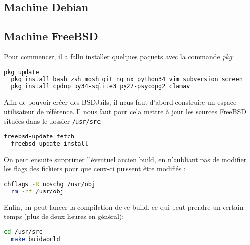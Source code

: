 \documentclass[10pt,a4paper]{article}
\begin{document}
\subsection{Machine Debian}
\label{sub:Machine Debian}

\subsection{Machine FreeBSD}
\label{sub:Machine FreeBSD}

Pour commencer, il a fallu installer quelques paquets avec la commande \emph{pkg}:
\begin{lstlisting}[language=bash]
  pkg update
  pkg install bash zsh mosh git nginx python34 vim subversion screen
  pkg install cpdup py34-sqlite3 py27-psycopg2 clamav
\end{lstlisting}

Afin de pouvoir créer des BSDJails, il nous faut d'abord construire un espace utilisateur de référence. Il nous faut pour cela mettre à jour les sources FreeBSD situées dans le dossier \texttt{/usr/src}:
\begin{lstlisting}[language=bash]
  freebsd-update fetch
  freebsd-update install
\end{lstlisting}
On peut ensuite supprimer l'éventuel ancien build, en n'oubliant pas de modifier les flags des fichiers pour que ceux-ci puissent être modifiés :
\begin{lstlisting}[language=bash]
  chflags -R noschg /usr/obj
  rm -rf /usr/obj
\end{lstlisting}
Enfin, on peut lancer la compilation de ce build, ce qui peut prendre un certain temps (plus de deux heures en général):
\begin{lstlisting}[language=bash]
  cd /usr/src
  make buidworld
\end{lstlisting}
\end{document}
